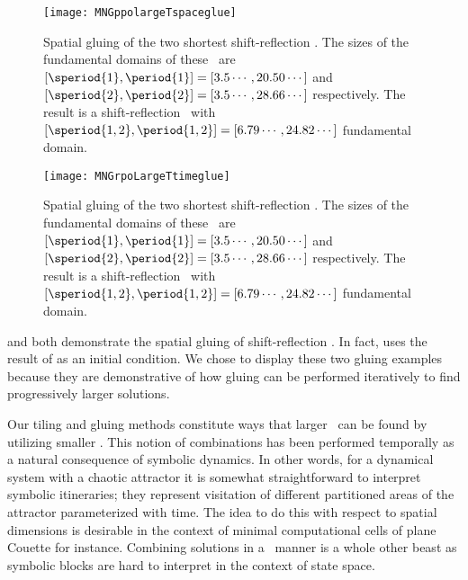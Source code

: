 \begin{figure}
\centering
\begin{minipage}[height=.4\textheight]{.66\textwidth}
\centering
\texttt{[image: MNGppolargeTspaceglue]}
\end{minipage}
\caption{ \label{fig:MNGppolargeTspaceglue}
Spatial gluing of the two shortest shift-reflection
\twots. The sizes of the fundamental domains of these
\twots\ are
$[\speriod{1},\period{1}]=[3.5\cdots,20.50\cdots]$
and
$[\speriod{2},\period{2}]=[3.5\cdots,28.66\cdots]$
respectively.
The result is a
shift-reflection \twot\ with
$[\speriod{1,2},\period{1,2}]=[6.79\cdots,24.82\cdots]$
fundamental domain.
}
\end{figure}


\begin{figure}
\centering
\begin{minipage}[height=.4\textheight]{.66\textwidth}
\centering
\texttt{[image: MNGrpoLargeTtimeglue]}
\end{minipage}
\caption{ \label{fig:MNGrpoLargeTtimeglue}
Spatial gluing of the two shortest shift-reflection
\twots. The sizes of the fundamental domains of these
\twots\ are
$[\speriod{1},\period{1}]=[3.5\cdots,20.50\cdots]$
and
$[\speriod{2},\period{2}]=[3.5\cdots,28.66\cdots]$
respectively.
The result is a
shift-reflection \twot\ with
$[\speriod{1,2},\period{1,2}]=[6.79\cdots,24.82\cdots]$
fundamental domain.
}
\end{figure}


and 
both demonstrate the spatial gluing
of shift-reflection \twots. In fact, 
uses the result of
as an initial
condition. We chose to display these two gluing examples
because they are demonstrative of how gluing can be performed
iteratively to find progressively larger solutions.


Our tiling and gluing methods constitute ways that larger \twots\
can be found by utilizing smaller \twots. This notion of combinations
has been performed temporally\rf{DV03} as a natural
consequence of symbolic dynamics. In other words, for a dynamical system
with a chaotic attractor it is somewhat straightforward to interpret
symbolic itineraries; they represent visitation of different partitioned
areas of the attractor parameterized with time.
The idea to do this with
respect to spatial dimensions is desirable in the context of minimal
computational cells of plane Couette for instance. Combining solutions
in a \spt\ manner is a whole other beast as symbolic blocks are
hard to interpret in the context of state space.
